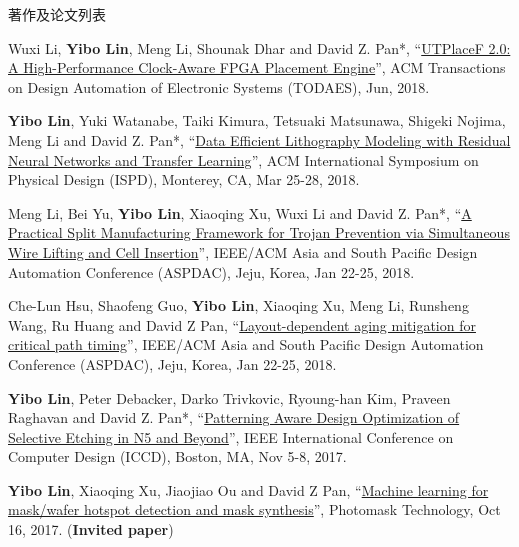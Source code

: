 \begin{rSection}{著作及论文列表}
\begin{description}[font=\normalfont, rightmargin=2em]
{}
            

\item[{[J24]}]{
        Wuxi Li, \textbf{Yibo Lin}, Meng Li, Shounak Dhar and David Z. Pan*, 
    ``\href{https://doi.org/10.1145/3174849}{UTPlaceF 2.0: A High-Performance Clock-Aware FPGA Placement Engine}'', 
    ACM Transactions on Design Automation of Electronic Systems (TODAES), Jun, 2018.
    
}
            

\item[{[C23]}]{
        \textbf{Yibo Lin}, Yuki Watanabe, Taiki Kimura, Tetsuaki Matsunawa, Shigeki Nojima, Meng Li and David Z. Pan*, 
    ``\href{https://doi.org/10.1145/3177540.3178242}{Data Efficient Lithography Modeling with Residual Neural Networks and Transfer Learning}'', 
    ACM International Symposium on Physical Design (ISPD), Monterey, CA, Mar 25-28, 2018.
    
}
            

\item[{[C22]}]{
        Meng Li, Bei Yu, \textbf{Yibo Lin}, Xiaoqing Xu, Wuxi Li and David Z. Pan*, 
    ``\href{https://doi.org/10.1109/ASPDAC.2018.8297316}{A Practical Split Manufacturing Framework for Trojan Prevention via Simultaneous Wire Lifting and Cell Insertion}'', 
    IEEE/ACM Asia and South Pacific Design Automation Conference (ASPDAC), Jeju, Korea, Jan 22-25, 2018.
    
}
            

\item[{[C21]}]{
        Che-Lun Hsu, Shaofeng Guo, \textbf{Yibo Lin}, Xiaoqing Xu, Meng Li, Runsheng Wang, Ru Huang and David Z Pan, 
    ``\href{https://doi.org/10.1109/ASPDAC.2018.8297298}{Layout-dependent aging mitigation for critical path timing}'', 
    IEEE/ACM Asia and South Pacific Design Automation Conference (ASPDAC), Jeju, Korea, Jan 22-25, 2018.
    
}
            

\item[{[C20]}]{
        \textbf{Yibo Lin}, Peter Debacker, Darko Trivkovic, Ryoung-han Kim, Praveen Raghavan and David Z. Pan*, 
    ``\href{https://doi.org/10.1109/ICCD.2017.72}{Patterning Aware Design Optimization of Selective Etching in N5 and Beyond}'', 
    IEEE International Conference on Computer Design (ICCD), Boston, MA, Nov 5-8, 2017.
    
}
            

\item[{[C19]}]{
        \textbf{Yibo Lin}, Xiaoqing Xu, Jiaojiao Ou and David Z Pan, 
    ``\href{http://dx.doi.org/10.1117/12.2282943}{Machine learning for mask/wafer hotspot detection and mask synthesis}'', 
    Photomask Technology, Oct 16, 2017.
    (\textbf{Invited paper})
}
            


\end{description}
\end{rSection}
